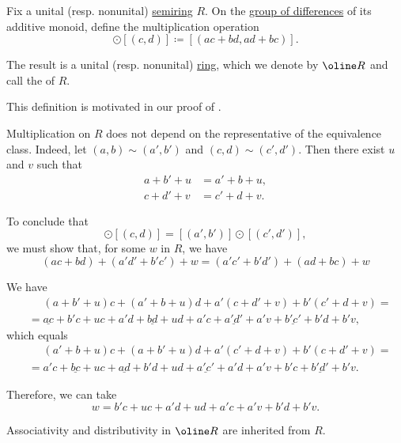 \begin{definition}\label{def:ring_of_differences}\mimprovised
  Fix a unital (resp. nonunital) \hyperref[def:semiring]{semiring} \( R \). On the \hyperref[def:group_of_differences]{group of differences} of its additive monoid, define the multiplication operation
  \begin{equation*}
    [(a, b)] \odot [(c, d)] \coloneqq [(ac + bd, ad + bc)].
  \end{equation*}

  The result is a unital (resp. nonunital) \hyperref[def:ring]{ring}, which we denote by \( \oline R \) and call the  of \( R \).
\end{definition}
\begin{comments}
  \item This definition is motivated in our proof of .
\end{comments}
\begin{defproof}
  Multiplication on \( R \) does not depend on the representative of the equivalence class. Indeed, let \( (a, b) \sim (a', b') \) and \( (c, d) \sim (c', d') \). Then there exist \( u \) and \( v \) such that
  \begin{align*}
    a + b' + u &= a' + b + u, \\
    c + d' + v &= c' + d + v.
  \end{align*}

  To conclude that
  \begin{equation*}
    [(a, b)] \odot [(c, d)] = [(a', b')] \odot [(c', d')],
  \end{equation*}
  we must show that, for some \( w \) in \( R \), we have
  \begin{equation*}
    (ac + bd) + (a'd' + b'c') + w = (a'c' + b'd') + (ad + bc) + w
  \end{equation*}

  We have
  \begin{align*}
    &\phantom{{}={}}
    (a + b' + u)c + (a' + b + u)d + a'(c + d' + v) + b'(c' + d + v)
    = \\ &=
    \underline{ac} + b'c + uc + a'd + \underline{bd} + ud + a'c + \underline{a'd'} + a'v + \underline{b'c'} + b'd + b'v,
  \end{align*}
  which equals
  \begin{align*}
    &\phantom{{}={}}
    (a' + b + u)c + (a + b' + u)d + a'(c' + d + v) + b'(c + d' + v)
    = \\ &=
    a'c + \underline{bc} + uc + \underline{ad} + b'd + ud + \underline{a'c'} + a'd + a'v + b'c + \underline{b'd'} + b'v.
  \end{align*}

  Therefore, we can take
  \begin{equation*}
    w = b'c + uc + a'd + ud + a'c + a'v + b'd + b'v.
  \end{equation*}

  Associativity and distributivity in \( \oline R \) are inherited from \( R \).
\end{defproof}

